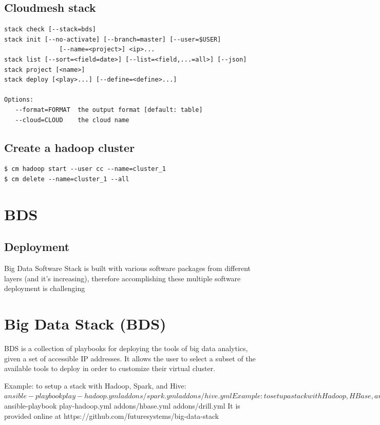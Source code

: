 \subsection{Cloudmesh stack}

\begin{Verbatim}[fontfamily=helvetica]
stack check [--stack=bds]
stack init [--no-activate] [--branch=master] [--user=$USER] 
               [--name=<project>] <ip>...
stack list [--sort=<field=date>] [--list=<field,...=all>] [--json]
stack project [<name>]
stack deploy [<play>...] [--define=<define>...]

Options:
   --format=FORMAT  the output format [default: table]
   --cloud=CLOUD    the cloud name
\end{Verbatim}

\subsection{Create a hadoop cluster}

\begin{Verbatim}[fontfamily=helvetica]
$ cm hadoop start --user cc --name=cluster_1
$ cm delete --name=cluster_1 --all  
\end{Verbatim}


\section{BDS}

\subsection{Deployment}

Big Data Software Stack is built with various software packages from different layers (and it’s increasing), therefore accomplishing these multiple software deployment is challenging



\section{Big Data Stack (BDS)}

BDS is a collection of playbooks for deploying the tools of big data analytics, given a set of accessible IP addresses. It allows the user to select a subset of the available tools to deploy in order to customize their virtual cluster.

Example: to setup a stack with Hadoop, Spark, and Hive:
$ ansible-playbook play-hadoop.yml addons/spark.yml addons/hive.yml
Example: to setup a stack with Hadoop, HBase, and Drill:
$ ansible-playbook play-hadoop.yml addons/hbase.yml addons/drill.yml
It is provided online at https://github.com/futuresystems/big-data-stack

